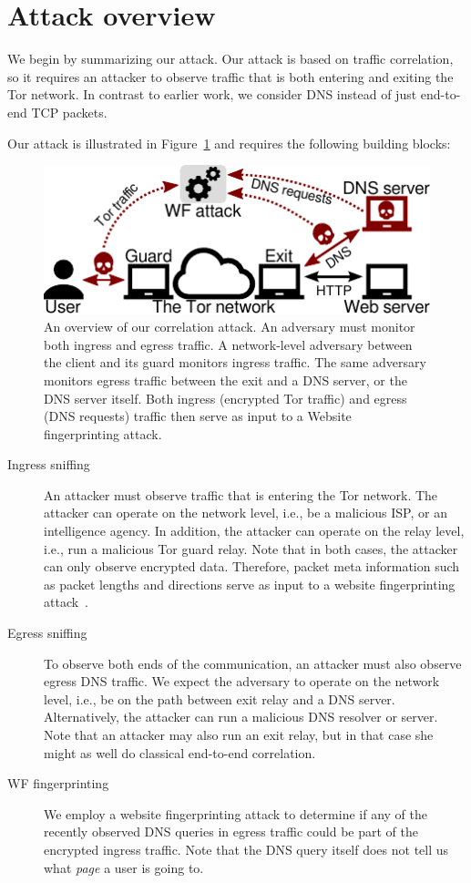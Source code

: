 \section{Attack overview}
\label{sec:attack}
We begin by summarizing our attack.  Our attack is based on traffic correlation,
so it requires an attacker to observe traffic that is both entering and exiting
the Tor network.  In contrast to earlier work, we consider DNS instead of just
end-to-end TCP packets.

Our attack is illustrated in Figure~\ref{fig:attack-scenario} and requires the
following building blocks:
\begin{figure}[t]
	\centering
	\includegraphics[width=0.8\linewidth]{figures/attack-scenario.pdf}
	\caption{An overview of our correlation attack.  An adversary must monitor
		both ingress and egress traffic.  A network-level adversary between the
		client and its guard monitors ingress traffic.  The same adversary
		monitors egress traffic between the exit and a DNS server, or the DNS
		server itself.  Both ingress (encrypted Tor traffic) and egress (DNS
		requests) traffic then serve as input to a Website fingerprinting
		attack.}
	\label{fig:attack-scenario}
\end{figure}

\begin{description}
	\item[Ingress sniffing] An attacker must observe traffic that is entering
		the Tor network.  The attacker can operate on the network level, i.e.,
		be a malicious ISP, or an intelligence agency.  In addition, the
		attacker can operate on the relay level, i.e., run a malicious Tor guard
		relay.  Note that in both cases, the attacker can only observe encrypted
		data.  Therefore, packet meta information such as packet lengths and
		directions serve as input to a website fingerprinting
		attack~\cite{Panchenko2016a}.
	\item[Egress sniffing] To observe both ends of the communication, an
		attacker must also observe egress DNS traffic.  We expect the adversary
		to operate on the network level, i.e., be on the path between exit relay
		and a DNS server.  Alternatively, the attacker can run a malicious DNS
		resolver or server.  Note that an attacker may also run an exit relay,
		but in that case she might as well do classical end-to-end correlation.
	\item[WF fingerprinting] We employ a website fingerprinting attack to
		determine if any of the recently observed DNS queries in egress traffic
		could be part of the encrypted ingress traffic.  Note that the DNS query
		itself does not tell us what \emph{page} a user is going to.
\end{description}

